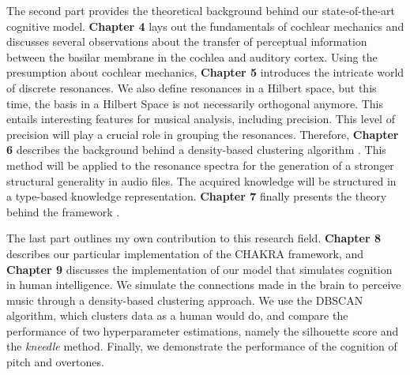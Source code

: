 The second part provides the theoretical background behind our state-of-the-art cognitive model.
\textbf{Chapter 4} lays out the fundamentals of cochlear mechanics and discusses several observations about the transfer of perceptual information between the basilar membrane in the cochlea and auditory cortex.  Using the presumption about cochlear mechanics, \textbf{Chapter 5} introduces the intricate world of discrete resonances.
We also define resonances in a Hilbert space, but this time, the basis in a Hilbert Space is not necessarily orthogonal anymore. This entails interesting features for musical analysis, including precision. This level of precision will play a crucial role in grouping the resonances. Therefore, \textbf{Chapter 6} describes the background behind a density-based clustering algorithm \parencite[DBSCAN]{ester_density-based_1996}. This method will be applied to the resonance spectra for the generation of a stronger structural generality in audio files. The acquired knowledge will be structured in a type-based knowledge representation. \textbf{Chapter 7} finally presents the theory behind the framework \parencite[CHAKRA]{harley_abstract_2020}.


The last part outlines my own contribution to this research field. \textbf{Chapter 8} describes our particular implementation of the CHAKRA framework, and \textbf{Chapter 9} discusses the implementation of our model that simulates cognition in human intelligence. We simulate the connections made in the brain to perceive music through a density-based clustering approach. We use the DBSCAN algorithm, which clusters data as a human would do, and compare the performance of two hyperparameter estimations, namely the silhouette score and the \textit{kneedle} method. Finally, we demonstrate the performance of the cognition of pitch and overtones.